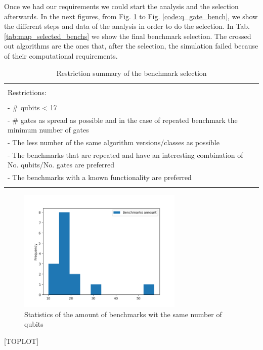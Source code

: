 Once we had our requirements we could start the analysis and the selection afterwards.
In the next figures, from Fig. \ref{fig:orgdd78932} to Fig. \ref{code:q_gate_bench}, we show the different steps and data of the analysis in order to do the selection.
In Tab. \ref{tab:map_selected_benchs} we show the final benchmark selection.
The crossed out algorithms are the ones that, after the selection, the simulation failed because of their computational requirements.
\begin{table}[htbp]
\caption{\label{tab:org668a24b}
Restriction summary of the benchmark selection}
\centering
\begin{tabular}{|l|}
\hline
\\
Restrictions:\\
\\
- \# qubits < 17\\
- \# gates as spread as possible and in the case of repeated benchmark the minimum number of gates\\
- The less number of the same algorithm versions/classes as possible\\
- The benchmarks that are repeated and have an interesting combination of No. qubits/No. gates are  preferred\\
- The benchmarks with a known functionality are preferred\\
\\
\hline
\end{tabular}
\end{table}
\begin{figure}[htbp]
\centering
\includegraphics[width=0.7\textwidth]{figures/number_of_benchmarks_depending_on_the_number_of_qubits.png}
\caption{\label{fig:orgdd78932}
Statistics of the amount of benchmarks wit the same number of qubits}
\end{figure}
[TOPLOT]


